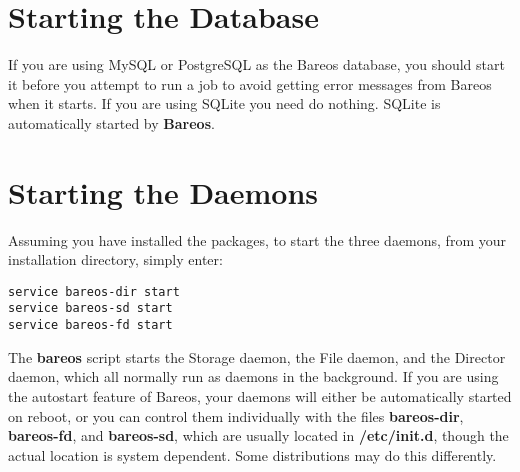 % 

\section{Starting the Database}
\label{StartDB}

If you are using MySQL or PostgreSQL as the Bareos database, you should start
it before you attempt to run a job to avoid getting error messages from Bareos
when it starts.
If you are using SQLite you need do nothing. SQLite is automatically
started by {\bf Bareos}.

\section{Starting the Daemons}
\label{StartDaemon}

Assuming you have installed the packages,
to start the three daemons, from your installation directory, simply enter:

\begin{verbatim}
service bareos-dir start
service bareos-sd start
service bareos-fd start
\end{verbatim}

The {\bf bareos} script starts the Storage daemon, the File daemon, and the
Director daemon, which all normally run as daemons in the background. If you
are using the autostart feature of Bareos, your daemons will either be
automatically started on reboot, or you can control them individually with the
files {\bf bareos-dir}, {\bf bareos-fd}, and {\bf bareos-sd}, which are
usually located in {\bf /etc/init.d}, though the actual location is system
dependent.
Some distributions may do this differently.

